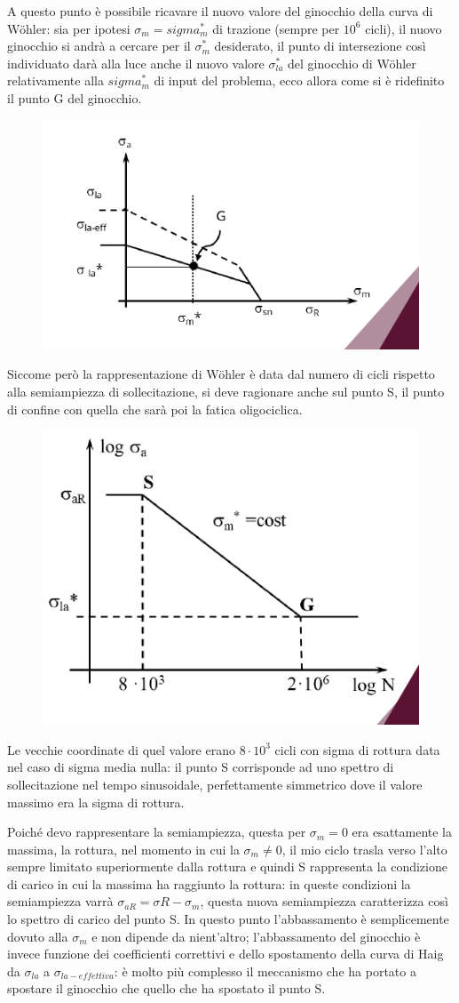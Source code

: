 			A questo punto è possibile ricavare il nuovo valore del ginocchio della curva di Wöhler: sia per ipotesi $\sigma_m = sigma_m^*$ di trazione (sempre per $10^6$ cicli), il nuovo ginocchio si andrà a cercare per il $\sigma_m^*$ desiderato, il punto di intersezione così individuato darà alla luce anche il nuovo valore $\sigma_{la}^*$ del ginocchio di Wöhler relativamente alla $sigma_m^*$ di input del problema, ecco allora come si è ridefinito il punto G del ginocchio.
			\begin{figure}[H]
				\centering
				\includegraphics[width=0.5\linewidth]{immagini_11/screenshot020}
				\label{fig:screenshot020}
			\end{figure}			 						
			Siccome però la rappresentazione di Wöhler è data dal numero di cicli rispetto alla semiampiezza di sollecitazione, si deve ragionare anche sul punto S, il punto di confine con quella che sarà poi la fatica oligociclica.
			\begin{figure}[H]
				\centering
				\includegraphics[width=0.5\linewidth]{immagini_11/screenshot021}
				\label{fig:screenshot021}
			\end{figure}			
			 Le vecchie coordinate di quel valore erano $8\cdot10^3$ cicli con sigma di rottura data nel caso di sigma media nulla: il punto S corrisponde ad uno spettro di sollecitazione nel tempo sinusoidale, perfettamente simmetrico dove il valore massimo era la sigma di rottura. 
			 
			 Poiché devo rappresentare la semiampiezza, questa per $\sigma_m=0$ era esattamente la massima, la rottura, nel momento in cui la $\sigma_m\ne0$, il mio ciclo trasla verso l'alto sempre limitato superiormente dalla rottura e quindi S rappresenta la condizione di carico in cui la massima ha raggiunto la rottura: in queste condizioni la semiampiezza varrà $\sigma_{aR} = \sigma{R} -\sigma_m$, questa nuova semiampiezza caratterizza così lo spettro di carico del punto S. In questo punto l'abbassamento è semplicemente dovuto alla $\sigma_m$ e non dipende da nient'altro; l'abbassamento del ginocchio è invece funzione dei coefficienti correttivi e dello spostamento della curva di Haig da $\sigma_{la}$ a $\sigma_{la-effettiva}$: è molto più complesso il meccanismo che ha portato a spostare il ginocchio che quello che ha spostato il punto S. \newline
						

